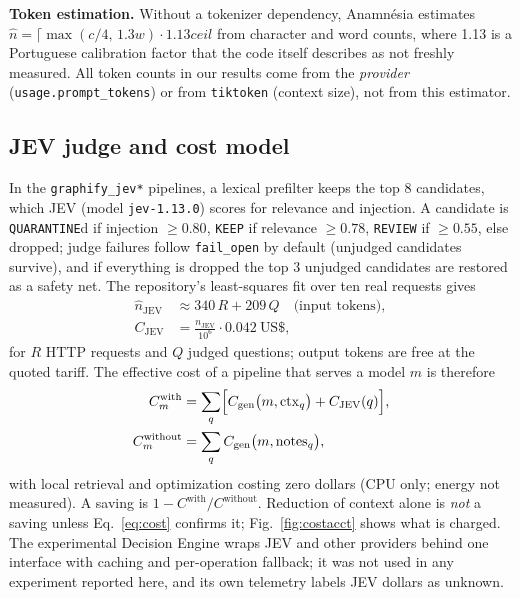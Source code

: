 \documentclass[conference,onecolumn,11pt]{IEEEtran}
\newcommand{\anam}{Anam\-n\'esia}
\begin{document}
\textbf{Token estimation.} Without a tokenizer dependency, \anam{} estimates $\hat n=\lceil \max(c/4,\,1.3w)\cdot 1.13
ceil$ from character and word counts, where 1.13 is a Portuguese calibration factor that the code itself describes as not freshly measured. All token counts in our results come from the \emph{provider} (\texttt{usage.prompt\_tokens}) or from \texttt{tiktoken} (context size), not from this estimator.

\subsection{JEV judge and cost model}\label{sec:cost}
In the \texttt{graphify\_jev*} pipelines, a lexical prefilter keeps the top 8 candidates, which JEV (model \texttt{jev-1.13.0}) scores for relevance and injection. A candidate is \texttt{QUARANTINE}d if injection $\ge0.80$, \texttt{KEEP} if relevance $\ge0.78$, \texttt{REVIEW} if $\ge0.55$, else dropped; judge failures follow \texttt{fail\_open} by default (unjudged candidates survive), and if everything is dropped the top 3 unjudged candidates are restored as a safety net. The repository's least-squares fit over ten real requests gives
\begin{equation}
\begin{aligned}
\hat n_{\mathrm{JEV}}&\approx 340\,R+209\,Q\quad\text{(input tokens)},\\
C_{\mathrm{JEV}}&=\frac{n_{\mathrm{JEV}}}{10^{6}}\cdot 0.042\ \text{US\$},
\end{aligned}\label{eq:jev}
\end{equation}
for $R$ HTTP requests and $Q$ judged questions; output tokens are free at the quoted tariff. The effective cost of a pipeline that serves a model $m$ is therefore
\begin{equation}
\begin{aligned}
C^{\text{with}}_m&=\sum_{q}\Bigl[C_{\mathrm{gen}}\bigl(m,\mathrm{ctx}_q\bigr)+C_{\mathrm{JEV}}(q)\Bigr],\\
C^{\text{without}}_m&=\sum_{q}C_{\mathrm{gen}}\bigl(m,\mathrm{notes}_q\bigr),
\end{aligned}\label{eq:cost}
\end{equation}
with local retrieval and optimization costing zero dollars (CPU only; energy not measured). A saving is $1-C^{\text{with}}/C^{\text{without}}$. Reduction of context alone is \emph{not} a saving unless Eq.~\eqref{eq:cost} confirms it; Fig.~\ref{fig:costacct} shows what is charged. The experimental Decision Engine wraps JEV and other providers behind one interface with caching and per-operation fallback; it was not used in any experiment reported here, and its own telemetry labels JEV dollars as unknown.
\end{document}
